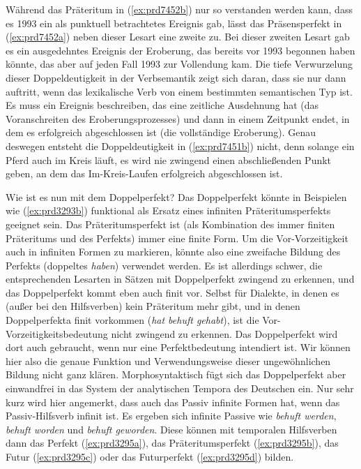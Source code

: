 \begin{exe}
  \ex\label{ex:prd7452} 
  \begin{xlist}
  \end{xlist}
\end{exe}

\label{abs:perfektsem}Während das Präteritum in (\ref{ex:prd7452b}) nur so verstanden werden kann, dass es 1993 ein als punktuell betrachtetes Ereignis gab, lässt das Präsensperfekt in (\ref{ex:prd7452a}) neben dieser Lesart eine zweite zu.
Bei dieser zweiten Lesart gab es ein ausgedehntes Ereignis der Eroberung, das bereits vor 1993 begonnen haben könnte, das aber auf jeden Fall 1993 zur Vollendung kam.
Die tiefe Verwurzelung dieser Doppeldeutigkeit in der Verbsemantik zeigt sich daran, dass sie nur dann auftritt, wenn das lexikalische Verb von einem bestimmten semantischen Typ ist.
Es muss ein Ereignis beschreiben, das eine zeitliche Ausdehnung hat (\zB das Voranschreiten des Eroberungsprozesses) und dann in einem Zeitpunkt endet, in dem es erfolgreich abgeschlossen ist (die vollständige Eroberung).
Genau deswegen entsteht die Doppeldeutigkeit in (\ref{ex:prd7451b}) nicht, denn solange ein Pferd auch im Kreis läuft, es wird nie zwingend einen abschließenden Punkt geben, an dem das Im-Kreis-Laufen erfolgreich abgeschlossen ist.

Wie ist es nun mit dem Doppelperfekt?
Das Doppelperfekt könnte in Beispielen wie (\ref{ex:prd3293b}) funktional als Ersatz eines infiniten Präteritumsperfekts geeignet sein.
Das Präteritumsperfekt ist (als Kombination des immer finiten Präteritums und des Perfekts) immer eine finite Form.
Um die Vor-Vorzeitigkeit auch in infiniten Formen zu markieren, könnte also eine zweifache Bildung des Perfekts (doppeltes \textit{haben}) verwendet werden.
Es ist allerdings schwer, die entsprechenden Lesarten in Sätzen mit Doppelperfekt zwingend zu erkennen, und das Doppelperfekt kommt eben auch finit vor.
Selbst für Dialekte, in denen es (außer bei den Hilfsverben) kein Präteritum mehr gibt, und in denen Doppelperfekta finit vorkommen (\textit{hat behuft gehabt}), ist die Vor-Vorzeitigkeitsbedeutung nicht zwingend zu erkennen.
Das Doppelperfekt wird dort auch gebraucht, wenn nur eine Perfektbedeutung intendiert ist.
Wir können hier also die genaue Funktion und Verwendungsweise dieser ungewöhnlichen Bildung nicht ganz klären.
Morphosyntaktisch fügt sich das Doppelperfekt aber einwandfrei in das System der analytischen Tempora des Deutschen ein.
Nur sehr kurz wird hier angemerkt, dass auch das Passiv infinite Formen hat, wenn das Passiv-Hilfsverb infinit ist.
Es ergeben sich infinite Passive wie \textit{behuft werden}, \textit{behuft worden} und \textit{behuft geworden}.
Diese können mit temporalen Hilfsverben dann das Perfekt (\ref{ex:prd3295a}), das Präteritumsperfekt (\ref{ex:prd3295b}), das Futur (\ref{ex:prd3295c}) oder das Futurperfekt (\ref{ex:prd3295d}) bilden.

